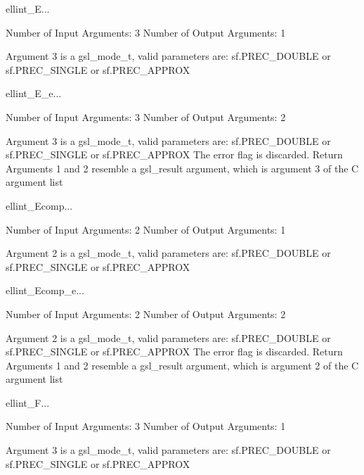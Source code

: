 \begin{funcdesc}{ellint_E}{...}

    Number of Input  Arguments:  3
    Number of Output Arguments:  1

 Argument 3 is a gsl_mode_t, valid parameters are:
	sf.PREC_DOUBLE or sf.PREC_SINGLE or sf.PREC_APPROX

\end{funcdesc}

\begin{funcdesc}{ellint_E_e}{...}

    Number of Input  Arguments:  3
    Number of Output Arguments:  2

 Argument 3 is a gsl_mode_t, valid parameters are:
	sf.PREC_DOUBLE or sf.PREC_SINGLE or sf.PREC_APPROX
The error flag is discarded.
Return Arguments 1 and 2 resemble a gsl_result argument,
	which is  argument 3 of the C argument list

\end{funcdesc}

\begin{funcdesc}{ellint_Ecomp}{...}

    Number of Input  Arguments:  2
    Number of Output Arguments:  1

 Argument 2 is a gsl_mode_t, valid parameters are:
	sf.PREC_DOUBLE or sf.PREC_SINGLE or sf.PREC_APPROX

\end{funcdesc}

\begin{funcdesc}{ellint_Ecomp_e}{...}

    Number of Input  Arguments:  2
    Number of Output Arguments:  2

 Argument 2 is a gsl_mode_t, valid parameters are:
	sf.PREC_DOUBLE or sf.PREC_SINGLE or sf.PREC_APPROX
The error flag is discarded.
Return Arguments 1 and 2 resemble a gsl_result argument,
	which is  argument 2 of the C argument list

\end{funcdesc}

\begin{funcdesc}{ellint_F}{...}

    Number of Input  Arguments:  3
    Number of Output Arguments:  1

 Argument 3 is a gsl_mode_t, valid parameters are:
	sf.PREC_DOUBLE or sf.PREC_SINGLE or sf.PREC_APPROX

\end{funcdesc}

